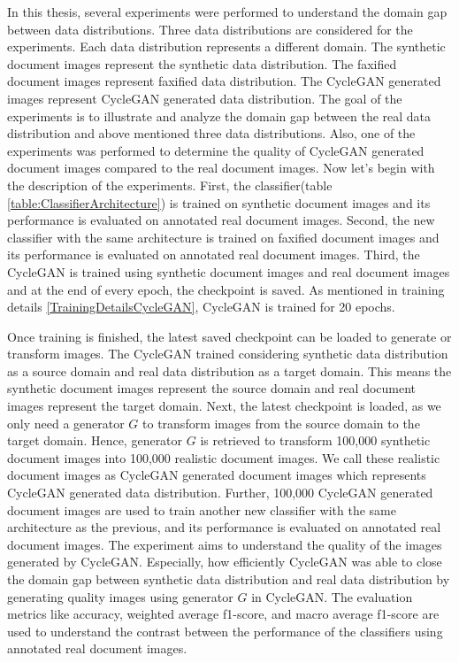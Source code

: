 In this thesis, several experiments were performed to understand the domain gap between data distributions. Three data distributions are considered for the experiments. Each data distribution represents a different domain. The synthetic document images represent the synthetic data distribution. The faxified document images represent faxified data distribution. The \ac{CycleGAN} generated images represent \ac{CycleGAN} generated data distribution. The goal of the experiments is to illustrate and analyze the domain gap between the real data distribution and above mentioned three data distributions. Also, one of the experiments was performed to determine the quality of \ac{CycleGAN} generated document images compared to the real document images. Now let's begin with the description of the experiments. First, the classifier(table \ref{table:ClassifierArchitecture}) is trained on synthetic document images and its performance is evaluated on annotated real document images. Second, the new classifier with the same architecture is trained on faxified document images and its performance is evaluated on annotated real document images. Third, the \ac{CycleGAN} is trained using synthetic document images and real document images and at the end of every epoch, the checkpoint is saved. As mentioned in training details \ref{TrainingDetailsCycleGAN}, \ac{CycleGAN} is trained for 20 epochs. 

Once training is finished, the latest saved checkpoint can be loaded to generate or transform images. The \ac{CycleGAN} trained considering synthetic data distribution as a source domain and real data distribution as a target domain. This means the synthetic document images represent the source domain and real document images represent the target domain. Next, the latest checkpoint is loaded, as we only need a generator $G$ to transform images from the source domain to the target domain. Hence, generator $G$ is retrieved to transform 100,000 synthetic document images into 100,000 realistic document images. We call these realistic document images as \ac{CycleGAN} generated document images which represents \ac{CycleGAN} generated data distribution. Further, 100,000 \ac{CycleGAN} generated document images are used to train another new classifier with the same architecture as the previous, and its performance is evaluated on annotated real document images. The experiment aims to understand the quality of the images generated by \ac{CycleGAN}. Especially, how efficiently \ac{CycleGAN} was able to close the domain gap between synthetic data distribution and real data distribution by generating quality images using generator $G$ in \ac{CycleGAN}. The evaluation metrics like accuracy, weighted average f1-score, and macro average f1-score \cite{lipton2014thresholding} are used to understand the contrast between the performance of the classifiers using annotated real document images.

